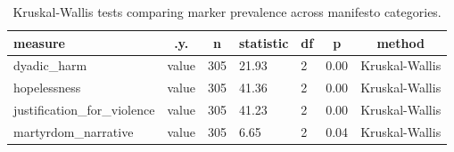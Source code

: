 \documentclass[
  english,
  man,floatsintext]{apa6}
\begin{document}
\begin{table}[tbp]

\begin{center}
\begin{threeparttable}

\caption{\label{tab:category-nonparametric-tests}Kruskal-Wallis tests comparing marker prevalence across manifesto categories.}

\begin{tabular}{lllllll}
\toprule
measure & \multicolumn{1}{c}{.y.} & \multicolumn{1}{c}{n} & \multicolumn{1}{c}{statistic} & \multicolumn{1}{c}{df} & \multicolumn{1}{c}{p} & \multicolumn{1}{c}{method}\\
\midrule
dyadic\_harm & value & 305 & 21.93 & 2 & 0.00 & Kruskal-Wallis\\
hopelessness & value & 305 & 41.36 & 2 & 0.00 & Kruskal-Wallis\\
justification\_for\_violence & value & 305 & 41.23 & 2 & 0.00 & Kruskal-Wallis\\
martyrdom\_narrative & value & 305 & 6.65 & 2 & 0.04 & Kruskal-Wallis\\
\bottomrule
\end{tabular}

\end{threeparttable}
\end{center}

\end{table}
\end{document}
